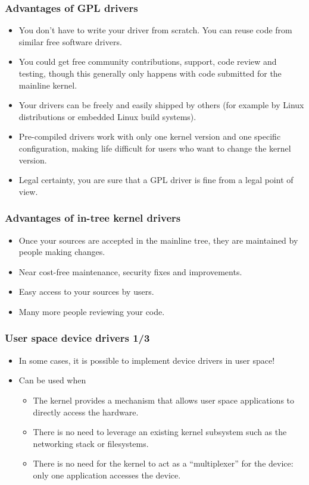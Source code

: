 \begin{frame}
  \frametitle{Advantages of GPL drivers}
  \begin{itemize}
  \item You don't have to write your driver from scratch. You can
    reuse code from similar free software drivers.
  \item You could get free community contributions, support, code
    review and testing, though this generally only happens with code
    submitted for the mainline kernel.
  \item Your drivers can be freely and easily shipped by others (for
    example by Linux distributions or embedded Linux build systems).
  \item Pre-compiled drivers work with only one kernel version and one
    specific configuration, making life difficult for users who want
    to change the kernel version.
  \item Legal certainty, you are sure that a GPL driver is fine from a
    legal point of view.
  \end{itemize}
\end{frame}

\begin{frame}
  \frametitle{Advantages of in-tree kernel drivers}
  \begin{itemize}
  \item Once your sources are accepted in the mainline tree, they are
    maintained by people making changes.
  \item Near cost-free maintenance, security fixes and improvements.
  \item Easy access to your sources by users.
  \item Many more people reviewing your code.
  \end{itemize}
\end{frame}

\begin{frame}
  \frametitle{User space device drivers 1/3}
  \begin{itemize}
  \item In some cases, it is possible to implement device drivers in
    user space!
  \item Can be used when
    \begin{itemize}
    \item The kernel provides a mechanism that allows user space
      applications to directly access the hardware.
    \item There is no need to leverage an existing kernel subsystem
      such as the networking stack or filesystems.
    \item There is no need for the kernel to act as a ``multiplexer''
      for the device: only one application accesses the device.
    \end{itemize}
  \end{itemize}
\end{frame}

